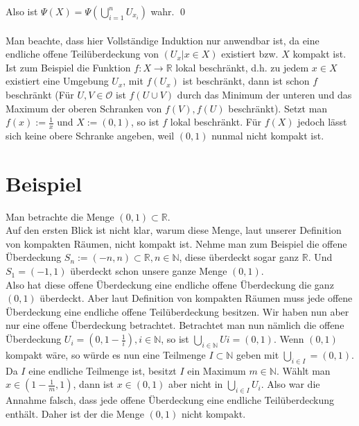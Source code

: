	Also ist \(\Psi(X) =  \Psi(\bigcup_{i=1}^{n} U_{x_i})\) wahr.
\qed
\\
\\
Man beachte, dass hier Vollständige Induktion nur anwendbar ist, da eine endliche offene Teilüberdeckung von \( (U_x | x \in X) \) existiert bzw. \(X\) kompakt ist.
Ist zum Beispiel die Funktion \(f : X \to \mathbb{R}\) lokal beschränkt, d.h. zu jedem \(x \in X\) existiert eine Umgebung \(U_x\), mit \(f(U_x)\) ist beschränkt, 
dann ist schon \(f\) beschränkt (Für \(U,V \in \mathcal{O}\) ist \(f(U \cup V)\) durch das Minimum der unteren und das Maximum der oberen 
Schranken von \(f(V), f(U)\) beschränkt). Setzt man \(f(x):=\frac{1}{x}\) und \(X:=(0,1)\), so ist \(f\) lokal beschränkt.
Für \(f(X)\) jedoch lässt sich keine obere Schranke angeben, weil \((0,1)\) nunmal nicht kompakt ist.


\section{Beispiel}
Man betrachte die Menge \( (0,1) \subset \mathbb{R} \).\\ Auf den ersten Blick ist nicht klar, warum diese Menge, laut unserer Definition von kompakten Räumen, nicht kompakt ist. 
Nehme man zum Beispiel die offene Überdeckung \( S_{n} := (-n,n) \subset \mathbb{R} , n \in \mathbb{N} \), diese überdeckt sogar ganz \(  \mathbb{R} \). 
Und \( S_{1} = (-1,1)  \) überdeckt schon unsere ganze Menge \( (0,1) \). \\
Also hat diese offene Überdeckung eine endliche offene Überdeckung die ganz \( (0,1)\) überdeckt.
Aber laut Definition von kompakten Räumen muss jede offene Überdeckung eine endliche offene Teilüberdeckung besitzen. Wir haben nun aber nur eine offene Überdeckung betrachtet. Betrachtet man nun nämlich die offene Überdeckung \( U_{i}=(0,1-\frac{1}{i}), i \in \mathbb{N} \), so ist \(\bigcup_{i \in \mathbb{N}} U{i} = (0,1) \). Wenn \( (0,1)  \) kompakt wäre, 
so würde es nun eine Teilmenge \(I \subset \mathbb{N} \) geben mit \(\bigcup_{i \in I} = (0,1) \).
Da \(I\) eine endliche Teilmenge ist, besitzt \(I\) ein Maximum \( m \in \mathbb{N} \). Wählt man \(x \in (1-\frac{1}{m},1) \), dann ist \(x \in (0,1) \) aber nicht in 
\(\bigcup_{i \in I} U_{i}\). Also war die Annahme falsch, dass jede offene Überdeckung eine endliche Teilüberdeckung enthält. Daher ist der die Menge \((0,1) \) nicht kompakt.
		

